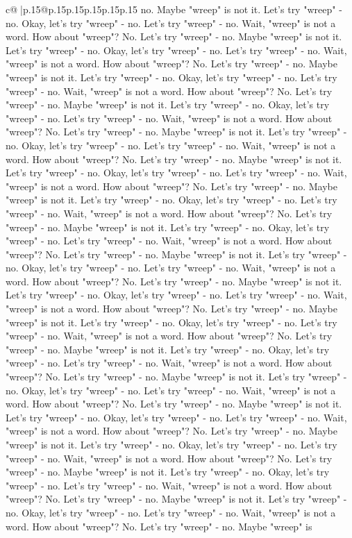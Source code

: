 \documentclass{article}
\begin{document}
{\begin{supertabular}{c@{$\;$}|p{.15\linewidth}@{}p{.15\linewidth}p{.15\linewidth}p{.15\linewidth}p{.15\linewidth}p{.15\linewidth}}
{{{no. Maybe "wreep" is not it. Let's try "wreep" {-} no. Okay, let's try "wreep" {-} no. Let's try "wreep" {-} no. Wait, "wreep" is not a word. How about "wreep"? No. Let's try "wreep" {-} no. Maybe "wreep" is not it. Let's try "wreep" {-} no. Okay, let's try "wreep" {-} no. Let's try "wreep" {-} no. Wait, "wreep" is not a word. How about "wreep"? No. Let's try "wreep" {-} no. Maybe "wreep" is not it. Let's try "wreep" {-} no. Okay, let's try "wreep" {-} no. Let's try "wreep" {-} no. Wait, "wreep" is not a word. How about "wreep"? No. Let's try "wreep" {-} no. Maybe "wreep" is not it. Let's try "wreep" {-} no. Okay, let's try "wreep" {-} no. Let's try "wreep" {-} no. Wait, "wreep" is not a word. How about "wreep"? No. Let's try "wreep" {-} no. Maybe "wreep" is not it. Let's try "wreep" {-} no. Okay, let's try "wreep" {-} no. Let's try "wreep" {-} no. Wait, "wreep" is not a word. How about "wreep"? No. Let's try "wreep" {-} no. Maybe "wreep" is not it. Let's try "wreep" {-} no. Okay, let's try "wreep" {-} no. Let's try "wreep" {-} no. Wait, "wreep" is not a word. How about "wreep"? No. Let's try "wreep" {-} no. Maybe "wreep" is not it. Let's try "wreep" {-} no. Okay, let's try "wreep" {-} no. Let's try "wreep" {-} no. Wait, "wreep" is not a word. How about "wreep"? No. Let's try "wreep" {-} no. Maybe "wreep" is not it. Let's try "wreep" {-} no. Okay, let's try "wreep" {-} no. Let's try "wreep" {-} no. Wait, "wreep" is not a word. How about "wreep"? No. Let's try "wreep" {-} no. Maybe "wreep" is not it. Let's try "wreep" {-} no. Okay, let's try "wreep" {-} no. Let's try "wreep" {-} no. Wait, "wreep" is not a word. How about "wreep"? No. Let's try "wreep" {-} no. Maybe "wreep" is not it. Let's try "wreep" {-} no. Okay, let's try "wreep" {-} no. Let's try "wreep" {-} no. Wait, "wreep" is not a word. How about "wreep"? No. Let's try "wreep" {-} no. Maybe "wreep" is not it. Let's try "wreep" {-} no. Okay, let's try "wreep" {-} no. Let's try "wreep" {-} no. Wait, "wreep" is not a word. How about "wreep"? No. Let's try "wreep" {-} no. Maybe "wreep" is not it. Let's try "wreep" {-} no. Okay, let's try "wreep" {-} no. Let's try "wreep" {-} no. Wait, "wreep" is not a word. How about "wreep"? No. Let's try "wreep" {-} no. Maybe "wreep" is not it. Let's try "wreep" {-} no. Okay, let's try "wreep" {-} no. Let's try "wreep" {-} no. Wait, "wreep" is not a word. How about "wreep"? No. Let's try "wreep" {-} no. Maybe "wreep" is not it. Let's try "wreep" {-} no. Okay, let's try "wreep" {-} no. Let's try "wreep" {-} no. Wait, "wreep" is not a word. How about "wreep"? No. Let's try "wreep" {-} no. Maybe "wreep" is not it. Let's try "wreep" {-} no. Okay, let's try "wreep" {-} no. Let's try "wreep" {-} no. Wait, "wreep" is not a word. How about "wreep"? No. Let's try "wreep" {-} no. Maybe "wreep" is not it. Let's try "wreep" {-} no. Okay, let's try "wreep" {-} no. Let's try "wreep" {-} no. Wait, "wreep" is not a word. How about "wreep"? No. Let's try "wreep" {-} no. Maybe "wreep" is not it. Let's try "wreep" {-} no. Okay, let's try "wreep" {-} no. Let's try "wreep" {-} no. Wait, "wreep" is not a word. How about "wreep"? No. Let's try "wreep" {-} no. Maybe "wreep" is }}}
\end{supertabular}}
\end{document}
